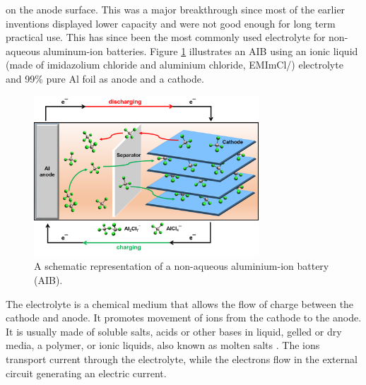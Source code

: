 on the anode surface. This was a major breakthrough since most of the earlier inventions displayed lower capacity and were not good enough for long term practical use. This has since been the most commonly used electrolyte for non-aqueous aluminum-ion batteries.
Figure \ref{Figures/chap1fig:AIBmech} illustrates an AIB using an ionic liquid  (made of imidazolium chloride and aluminium chloride, EMImCl/) electrolyte and 99\% pure Al foil as anode and a cathode.

\begin{figure}[tbh!]
\centering
\includegraphics[width=0.75\textwidth]{Figures/chap1fig/AIBmech}
\caption{A schematic representation of a non-aqueous aluminium-ion battery (AIB).}
\label{Figures/chap1fig:AIBmech}
\end{figure}

The electrolyte is a chemical medium that allows the flow of charge between the cathode and anode. It promotes movement of ions from the cathode to the anode. It is usually made of soluble salts, acids or other bases in liquid, gelled or dry media, a polymer, or ionic liquids, also known as molten salts \cite{xu_nonaqueous_2004,armand_ionic-liquid_2009,croce_nanocomposite_1998}. The ions transport current through the electrolyte, while the electrons flow in the external circuit generating an electric current.

